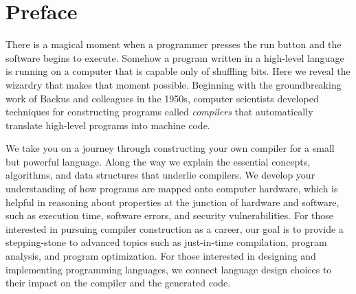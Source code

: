 \documentclass[7x10]{TimesAPriori_MIT}%
\numberwithin{theorem}{chapter}
\numberwithin{definition}{chapter}
\numberwithin{equation}{chapter}
\begin{document}
\begin{copyrightpage}





\end{copyrightpage}

\dedication{This book is dedicated to the programming language wonks
  at Indiana University.}



\tableofcontents



\chapter*{Preface}

There is a magical moment when a programmer presses the run button
and the software begins to execute. Somehow a program written in a
high-level language is running on a computer that is capable only of
shuffling bits. Here we reveal the wizardry that makes that moment
possible. Beginning with the groundbreaking work of Backus and
colleagues in the 1950s, computer scientists developed techniques for
constructing programs called \emph{compilers} that automatically
translate high-level programs into machine code.

We take you on a journey through constructing your own compiler for a
small but powerful language. Along the way we explain the essential
concepts, algorithms, and data structures that underlie compilers. We
develop your understanding of how programs are mapped onto computer
hardware, which is helpful in reasoning about properties at the
junction of hardware and software, such as execution time, software
errors, and security vulnerabilities.  For those interested in
pursuing compiler construction as a career, our goal is to provide a
stepping-stone to advanced topics such as just-in-time compilation,
program analysis, and program optimization.  For those interested in
designing and implementing programming languages, we connect language
design choices to their impact on the compiler and the generated code.
\end{document}

